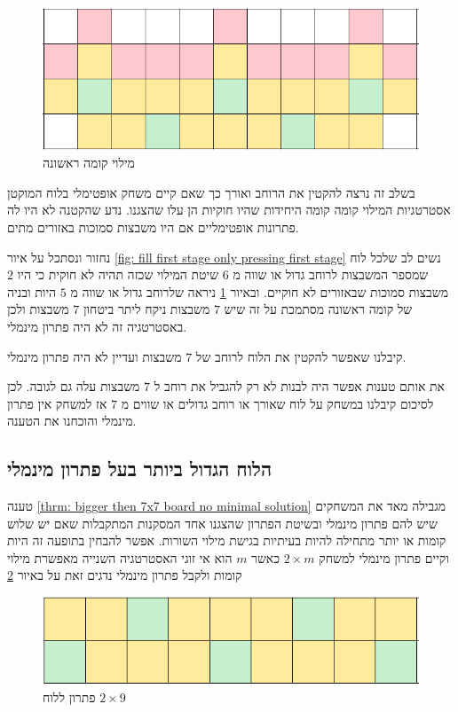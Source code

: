 \documentclass[12pt,twoside]{article}
\begin{document}
\begin{figure}[ht]
    \caption{מילוי קומה ראשונה}
    \label{fig: fill first stage second attempt fails}
    \unsethebrew
    \centering
    \includegraphics[width=.7\textwidth,height=.7\textheight,keepaspectratio]{images/first_stage_fill_only_first_stage_click_fail.PNG}
\end{figure}
\sethebrew

בשלב זה נרצה להקטין את הרוחב ואורך כך שאם קיים 
משחק אופטימלי בלוח המוקטן אסטרטגיות המילוי קומה קומה היחידות 
שהיו חוקיות הן עלו שהצגנו.
נדע שהקטנה לא היו לה פתרונות אופטימליים אם היו משבצות סמוכות באזורים מתים.

נחזור ונסתכל על איור 
\ref{fig: fill first stage only pressing first stage}
נשים לב שלכל לוח שמספר המשבצות לרוחב גדול או שווה 
מ
$6$
שיטת המילוי שכזה תהיה לא חוקית כי היו 
$2$
משבצות סמוכות שבאזורים לא חוקיים.
ובאיור 
\ref{fig: fill first stage second attempt fails}
ניראה
שלרוחב גדול או שווה 
מ
$5$
היות ובניה
של קומה ראשונה מסתמכת על זה שיש 
$7$
משבצות ניקח ליתר ביטחון 
$7$
משבצות ולכן באסטרטגיה זה לא היה פתרון מינמלי.

קיבלנו שאפשר להקטין את הלוח לרוחב של
$7$
משבצות 
ועדיין לא היה פתרון  מינמלי. 

את אותם טענות אפשר היה לבנות לא רק להגביל את רוחב ל
$7$
משבצות עלה גם לגובה.
לכן לסיכום קיבלנו 
במשחק על לוח 
שאורך או רוחב גדולים או שווים מ
$7$
אז
למשחק אין פתרון מינמלי
והוכחנו את הטענה.


\subsection{הלוח הגדול ביותר בעל פתרון מינמלי}
טענה 
\ref{thrm: bigger then 7x7 board no minimal solution} 
מגבילה מאד את המשחקים שיש להם פתרון מינמלי ובשיטת הפתרון שהצגנו
אחד המסקנות המתקבלות שאם יש שלוש קומות או יותר מתחילה
להיות בעיתיות בגישת מילוי השורות.
אפשר להבחין בתופעה זה היות וקיים פתרון מינמלי למשחק 
$2 \times m$
כאשר 
$m$
הוא אי זוגי
האסטרטגיה השנייה מאפשרת מילוי קומות ולקבל פתרון מינמלי
נדגים זאת על באיור 
\ref{fig: 2x9 have min sol}

\begin{figure}[ht]
    \caption{פתרון ללוח 
    $2 \times 9$}
    \label{fig: 2x9 have min sol}
    \unsethebrew
    \centering
    \includegraphics[width=.7\textwidth,height=.7\textheight,keepaspectratio]{images/2xm_sol.PNG}
\end{figure}
\sethebrew
\end{document}
